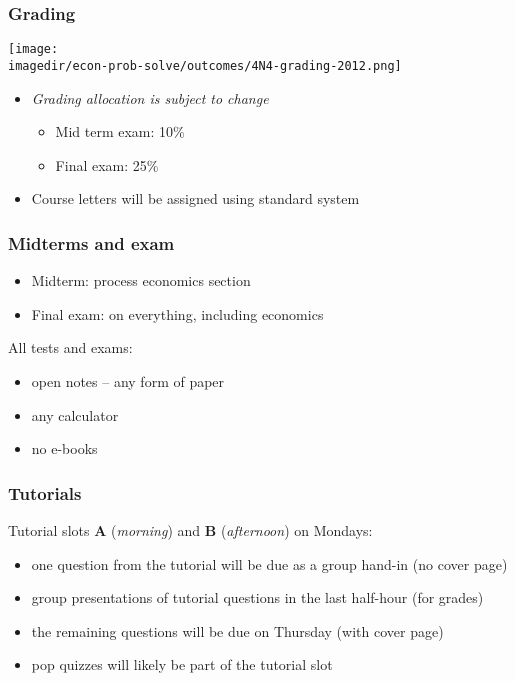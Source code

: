 \begin{frame}\frametitle{Grading}
	\begin{center}
		\texttt{[image: \\imagedir/econ-prob-solve/outcomes/4N4-grading-2012.png]}
	\end{center}
	\begin{itemize}
		\item	\emph{Grading allocation is subject to change}
		\begin{itemize}
			\item	Mid term exam: 10\%
			\item	Final exam: 25\%
		\end{itemize}
		\item	Course letters will be assigned using standard system
	\end{itemize}
\end{frame}

\begin{frame}\frametitle{Midterms and exam}
	
	\begin{itemize}
		\item	Midterm: process economics section
		\item	Final exam: on everything, including economics
	\end{itemize}
	\vspace{24pt}
	All tests and exams:
	\begin{itemize}
		\item	open notes -- any form of paper
		\item	any calculator
		\item	no e-books
	\end{itemize}	
\end{frame}

\begin{frame}\frametitle{Tutorials}
	Tutorial slots \textbf{A} (\emph{morning}) and \textbf{B} (\emph{afternoon}) on Mondays:
	
	\begin{itemize}
		\item	one question from the tutorial will be due as a group hand-in (no cover page)
		\item	group presentations of tutorial questions in the last half-hour (for grades)
		\item	the remaining questions will be due on Thursday (with cover page)
		\item	pop quizzes will likely be part of the tutorial slot
	\end{itemize}
\end{frame}

